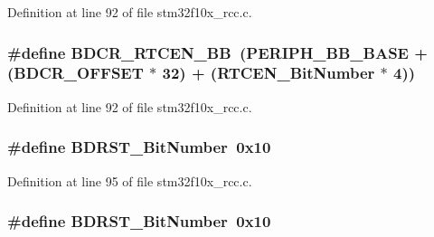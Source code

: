 Definition at line 92 of file stm32f10x\+\_\+rcc.\+c.

\subsubsection[{\texorpdfstring{B\+D\+C\+R\+\_\+\+R\+T\+C\+E\+N\+\_\+\+BB}{BDCR_RTCEN_BB}}]{\setlength{\rightskip}{0pt plus 5cm}\#define B\+D\+C\+R\+\_\+\+R\+T\+C\+E\+N\+\_\+\+BB~({\bf P\+E\+R\+I\+P\+H\+\_\+\+B\+B\+\_\+\+B\+A\+SE} + ({\bf B\+D\+C\+R\+\_\+\+O\+F\+F\+S\+ET} $\ast$ 32) + ({\bf R\+T\+C\+E\+N\+\_\+\+Bit\+Number} $\ast$ 4))}\hypertarget{group___r_c_c___private___defines_gaf70aaf70b0752ccb3a60307b2fb46038}{}\label{group___r_c_c___private___defines_gaf70aaf70b0752ccb3a60307b2fb46038}


Definition at line 92 of file stm32f10x\+\_\+rcc.\+c.

\subsubsection[{\texorpdfstring{B\+D\+R\+S\+T\+\_\+\+Bit\+Number}{BDRST_BitNumber}}]{\setlength{\rightskip}{0pt plus 5cm}\#define B\+D\+R\+S\+T\+\_\+\+Bit\+Number~0x10}\hypertarget{group___r_c_c___private___defines_gae6718158034388d8fde8caaa28ffe8b9}{}\label{group___r_c_c___private___defines_gae6718158034388d8fde8caaa28ffe8b9}


Definition at line 95 of file stm32f10x\+\_\+rcc.\+c.

\subsubsection[{\texorpdfstring{B\+D\+R\+S\+T\+\_\+\+Bit\+Number}{BDRST_BitNumber}}]{\setlength{\rightskip}{0pt plus 5cm}\#define B\+D\+R\+S\+T\+\_\+\+Bit\+Number~0x10}\hypertarget{group___r_c_c___private___defines_gae6718158034388d8fde8caaa28ffe8b9}{}\label{group___r_c_c___private___defines_gae6718158034388d8fde8caaa28ffe8b9}


